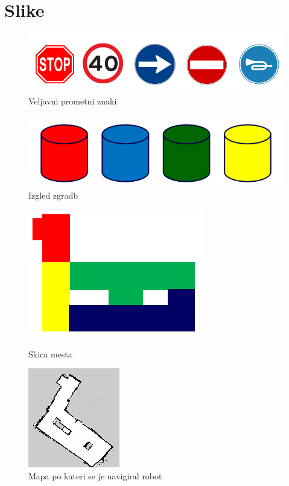 \documentclass[a4paper,11pt]{article}
\begin{document}
\section{\label{sec:slike}Slike}
\begin{figure}[htbp]
\begin{center}
\includegraphics[width=\textwidth]{signs.png}
\caption{Veljavni prometni znaki}
\label{slika1}
\end{center}
\end{figure}

\begin{figure}[htbp]
\begin{center}
\includegraphics[width=\textwidth]{buildings.png}
\caption{Izgled zgradb}
\label{slika1}
\end{center}
\end{figure}

\begin{figure}[!tbp]
  \centering
  \begin{minipage}[b]{0.4\textwidth}
	\includegraphics[scale=1]{city.png}
	\caption{Skica mesta}
  \end{minipage}
  \hfill
  \begin{minipage}[b]{0.4\textwidth}
	\includegraphics[scale=1]{robotMap.png}
	\caption{Mapa po kateri se je navigiral robot}
  \end{minipage}
\end{figure}
\end{document}

